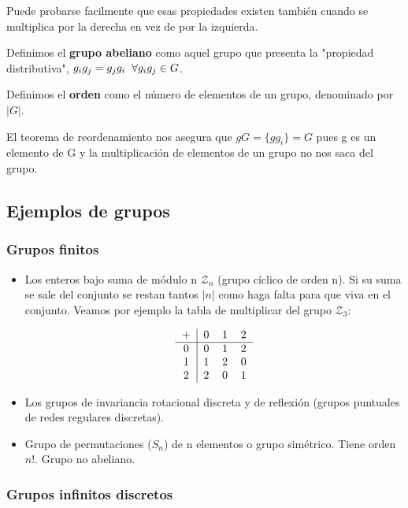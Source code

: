 \documentclass{article}
\begin{document}
Puede probarse facilmente que esas propiedades existen también cuando se multiplica por la derecha en vez de por la izquierda.

\smallskip
Definimos el \textbf{grupo abeliano} como aquel grupo que presenta la "propiedad distributiva", $g_ig_j=g_jg_i \hspace{0.2cm} \forall g_ig_j \in G$.

\smallskip
Definimos el \textbf{orden} como el número de elementos de un grupo, denominado por $|G|$.

\smallskip
El teorema de reordenamiento nos asegura que $gG=\lbrace gg_i\rbrace =G$ pues g es un elemento de G y la multiplicación de elementos de un grupo no nos saca del grupo.

\subsection{Ejemplos de grupos}

\subsubsection{Grupos finitos}

\begin{itemize}
\item Los enteros bajo suma de módulo n $\mathcal{Z}_n$ (grupo cíclico de orden n). Si su suma se sale del conjunto se restan tantos $|n|$ como haga falta para que viva en el conjunto. Veamos por ejemplo la tabla de multiplicar del grupo $\mathcal{Z}_3$:

$$\begin{tabular}[b]{ c | c c c }

+ & 0 & 1 & 2 \\
\hline
0  & 0 & 1 & 2 \\

1 & 1 & 2 & 0 \\

2 & 2 & 0 & 1

\end{tabular}
$$

\item Los grupos de invariancia rotacional discreta y de reflexión (grupos puntuales de redes regulares discretas).
\item Grupo de permutaciones ($S_n$) de n elementos o grupo simétrico. Tiene orden $n!$. Grupo no abeliano.
\end{itemize}

\subsubsection{Grupos infinitos discretos}
\end{document}

